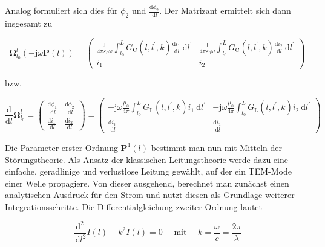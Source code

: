 Analog formuliert sich dies für $\phi_{2}$ und $\frac{\mathrm{d} \phi_{2}}{\mathrm{~d} l}$. Der Matrizant ermittelt sich dann insgesamt zu

\begin{equation}
	\boldsymbol{\Omega}_{l_{0}}^{l}(-\mathrm{j} \omega \mathbf{P}(l))=\left(\begin{array}{cc}
		\frac{\mathrm{j}}{4 \pi \varepsilon_{0} \omega} \int_{l_{0}}^{L} G_{\mathrm{C}}\left(l, l^{\prime}, k\right) \frac{\mathrm{d} i_{1}}{\mathrm{~d} l} \mathrm{~d} l^{\prime} & \frac{\mathrm{j}}{4 \pi \varepsilon_{0} \omega} \int_{l_{0}}^{L} G_{\mathrm{C}}\left(l, l^{\prime}, k\right) \frac{\mathrm{d} i_{2}}{\mathrm{~d} l} \mathrm{~d} l^{\prime}  \\
		i_{1} & i_{2}
	\end{array}\right)
\end{equation}

bzw.

\begin{equation}
	\frac{\mathrm{d}}{\mathrm{d} l} \boldsymbol{\Omega}_{l_0}^l=\left(\begin{array}{cc}
		\frac{\mathrm{d} \phi_1}{\mathrm{~d} l} & \frac{\mathrm{d} \phi_2}{\mathrm{~d} l} \\
		\frac{\mathrm{d} i_1}{\mathrm{~d} l} & \frac{\mathrm{d} i_2}{\mathrm{~d} l}
	\end{array}\right)=\left(\begin{array}{cc}
		-\mathrm{j} \omega \frac{\mu_0}{4 \pi} \int_{l_0}^L G_{\mathrm{L}}\left(l, l^{\prime}, k\right) i_1 \mathrm{~d} l^{\prime} & -\mathrm{j} \omega \frac{\mu_0}{4 \pi} \int_{l_0}^L G_{\mathrm{L}}\left(l, l^{\prime}, k\right) i_2 \mathrm{~d} l^{\prime} \\
		\frac{\mathrm{d} i_1}{\mathrm{~d} l} & \frac{\mathrm{d} i_2}{\mathrm{~d} l}
	\end{array}\right)
\end{equation}

Die Parameter erster Ordnung $\mathbf{P}^{1}(l)$ bestimmt man nun mit Mitteln der Störungstheorie. Als Ansatz der klassischen Leitungstheorie werde dazu eine einfache, geradlinige und verlustlose Leitung gewählt, auf der ein TEM-Mode einer Welle propagiere. Von dieser ausgehend, berechnet man zunächst einen analytischen Ausdruck für den Strom und nutzt diesen als Grundlage weiterer Integrationsschritte. Die Differentialgleichung zweiter Ordnung lautet


\begin{equation}
	\frac{\mathrm{d}^{2}}{\mathrm{~d} l^{2}} I(l)+k^{2} I(l)=0 \quad \text { mit } \quad k=\frac{\omega}{c}=\frac{2 \pi}{\lambda} 
\end{equation}


